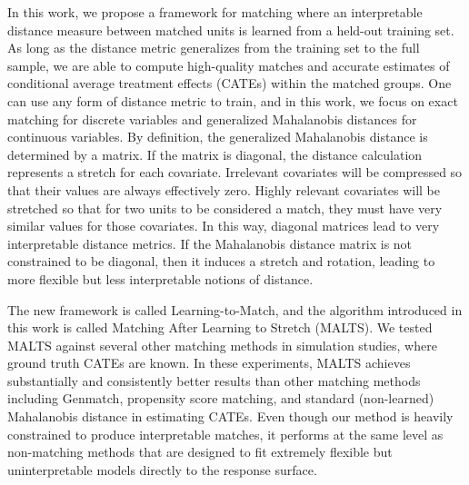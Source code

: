 In this work, we propose a framework for matching where an interpretable distance measure between matched units is learned from a held-out training set. As long as the distance metric generalizes from the training set to the full sample, we are able to compute high-quality matches and accurate estimates of conditional average treatment effects (CATEs) within the matched groups. One can use any form of distance metric to train, and in this work, we focus on exact matching for discrete variables and generalized Mahalanobis distances for continuous variables. By definition, the generalized Mahalanobis distance is determined by a matrix. If the matrix is diagonal, the distance calculation represents a stretch for each covariate. Irrelevant covariates will be compressed so that their values are always effectively zero. Highly relevant covariates will be stretched so that for two units to be considered a match, they must have very similar values for those covariates. In this way, diagonal matrices lead to very interpretable distance metrics. If the Mahalanobis distance matrix is not constrained to be diagonal, then it induces a stretch and rotation, leading to more flexible but less interpretable notions of distance. 

The new framework is called Learning-to-Match, and the algorithm introduced in this work is called Matching After Learning to Stretch (MALTS). We tested MALTS against several other matching methods in simulation studies, where ground truth CATEs are known. In these experiments, MALTS achieves substantially and consistently better results than other matching methods including Genmatch, propensity score matching, and standard (non-learned) Mahalanobis distance in estimating CATEs. Even though our method is heavily constrained to produce interpretable matches, it performs at the same level as non-matching methods that are designed to fit extremely flexible but uninterpretable models directly to the response surface.

